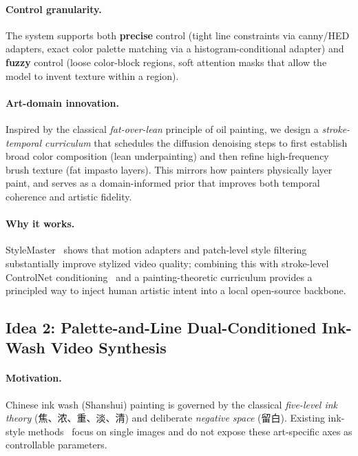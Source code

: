 \paragraph{Control granularity.} The system supports both \textbf{precise} control
(tight line constraints via canny/HED adapters, exact color palette matching via a
histogram-conditional adapter) and \textbf{fuzzy} control (loose color-block regions,
soft attention masks that allow the model to invent texture within a region).

\paragraph{Art-domain innovation.} Inspired by the classical \emph{fat-over-lean}
principle of oil painting, we design a \emph{stroke-temporal curriculum} that schedules
the diffusion denoising steps to first establish broad color composition (lean
underpainting) and then refine high-frequency brush texture (fat impasto layers). This
mirrors how painters physically layer paint, and serves as a domain-informed prior that
improves both temporal coherence and artistic fidelity.

\paragraph{Why it works.} StyleMaster~\cite{ye2025stylemaster} shows that motion adapters
and patch-level style filtering substantially improve stylized video quality; combining
this with stroke-level ControlNet conditioning~\cite{zhang2023controlnet} and a
painting-theoretic curriculum provides a principled way to inject human artistic intent
into a local open-source backbone.

\subsection{Idea 2: Palette-and-Line Dual-Conditioned Ink-Wash Video Synthesis}
\label{sec:idea2}

\paragraph{Motivation.} Chinese ink wash (Shanshui) painting is governed by the
classical \emph{five-level ink theory} (焦、浓、重、淡、清) and deliberate \emph{negative
space} (留白). Existing ink-style methods~\cite{he2023bitgan,liu2026chipdiff,zhang2025inkspirit}
focus on single images and do not expose these art-specific axes as controllable
parameters.

